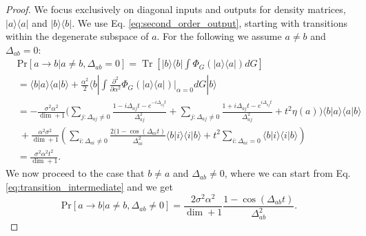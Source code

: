 \documentclass{article}
\newcommand{\ket}[1]{|#1\rangle}
\newcommand{\bra}[1]{\langle #1|}
\newcommand{\braket}[2]{\langle #1|#2\rangle}
\newcommand{\ketbra}[2]{| #1\rangle\! \langle #2|}
\newcommand{\parens}[1]{\left( #1 \right)}
\newcommand{\brackets}[1]{\left[ #1 \right]}
\newcommand{\prob}[1]{\text{Pr}\left[ #1 \right]}
\DeclareMathOperator{\Tr}{Tr}
\newcommand{\trace}[1]{\Tr \brackets{ #1 }}
\begin{document}
\begin{proof}
    We focus exclusively on diagonal inputs and outputs for density matrices, $\ketbra{a}{a}$ and $\ketbra{b}{b}$. We use Eq. \eqref{eq:second_order_output}, starting with transitions within the degenerate subspace of $a$. For the following we assume $a \neq b$ and $\Delta_{ab} = 0$: 
    \begin{align}
        &\prob{a \to b | a \neq b, \Delta_{ab} = 0} = \trace{\ketbra{b}{b} \int \Phi_G(\ketbra{a}{a}) dG} \\
        &= \braket{b}{a} \braket{a}{b} + \frac{\alpha^2}{2} \bra{b} \int \frac{\partial^2}{\partial \alpha^2} \Phi_G(\ketbra{a}{a})\bigg|_{\alpha = 0} dG \ket{b} \\
        &= -\frac{\sigma^2 \alpha^2}{\dim + 1} \bigg(\sum_{j: \Delta_{aj} \neq 0} \frac{1 - i \Delta_{aj}t - e^{-i \Delta_{aj} t}}{\Delta_{aj}^2} + \sum_{j: \Delta_{aj} \neq 0} \frac{1 + i \Delta_{aj} t - e^{i \Delta_{aj} t}}{\Delta_{aj}^2} + t^2 \eta(a) \bigg) \braket{b}{a} \braket{a}{b} \nonumber \\
        &~+ \frac{\alpha^2 \sigma^2}{\dim + 1} \parens{\sum_{i: \Delta_{ai} \neq 0} \frac{2(1- \cos(\Delta_{ai} t)}{\Delta_{ai}^2} \braket{b}{i}\braket{i}{b} + t^2 \sum_{i: \Delta_{ai} = 0 } \braket{b}{i} \braket{i}{b}} \label{eq:transition_intermediate} \\
        &= \frac{\sigma^2 \alpha^2 t^2}{\dim + 1}. 
    \end{align}
    We now proceed to the case that $b \neq a$ and $\Delta_{ab} \neq 0$, where we can start from Eq. \eqref{eq:transition_intermediate} and we get
    \begin{equation}
        \prob{a \to b | a \neq b, \Delta_{ab} \neq 0} = \frac{2 \sigma^2 \alpha^2 }{\dim + 1} \frac{1 - \cos (\Delta_{ab} t)}{\Delta_{ab}^2}.
    \end{equation}


\end{proof}
\end{document}
